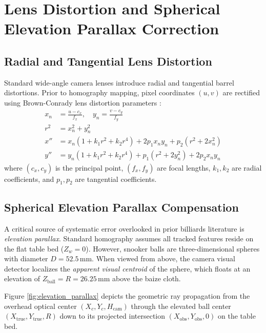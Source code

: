 \section{Lens Distortion and Spherical Elevation Parallax Correction}

\subsection{Radial and Tangential Lens Distortion}
Standard wide-angle camera lenses introduce radial and tangential barrel distortions. Prior to homography mapping, pixel coordinates $(u, v)$ are rectified using Brown-Conrady lens distortion parameters \cite{ref35}:
\begin{align}
    x_n &= \frac{u - c_x}{f_x}, \quad y_n = \frac{v - c_y}{f_y} \\
    r^2 &= x_n^2 + y_n^2 \\
    x'' &= x_n (1 + k_1 r^2 + k_2 r^4) + 2 p_1 x_n y_n + p_2 (r^2 + 2 x_n^2) \\
    y'' &= y_n (1 + k_1 r^2 + k_2 r^4) + p_1 (r^2 + 2 y_n^2) + 2 p_2 x_n y_n
\end{align}
where $(c_x, c_y)$ is the principal point, $(f_x, f_y)$ are focal lengths, $k_1, k_2$ are radial coefficients, and $p_1, p_2$ are tangential coefficients.

\subsection{Spherical Elevation Parallax Compensation}
A critical source of systematic error overlooked in prior billiards literature \cite{ref1, ref2, ref7} is \textit{elevation parallax}. Standard homography assumes all tracked features reside on the flat table bed ($Z_w = 0$). However, snooker balls are three-dimensional spheres with diameter $D = 52.5\,\text{mm}$. When viewed from above, the camera visual detector localizes the \textit{apparent visual centroid} of the sphere, which floats at an elevation of $Z_{\text{ball}} = R = 26.25\,\text{mm}$ above the baize cloth.

Figure \ref{fig:elevation_parallax} depicts the geometric ray propagation from the overhead optical center $(X_c, Y_c, H_{\text{cam}})$ through the elevated ball center $(X_{\text{true}}, Y_{\text{true}}, R)$ down to its projected intersection $(X_{\text{obs}}, Y_{\text{obs}}, 0)$ on the table bed.

